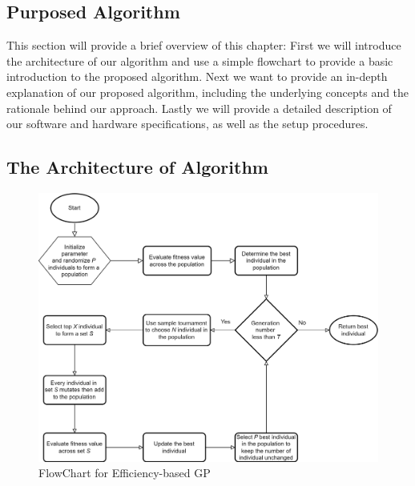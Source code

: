 \begin{ZhChapter}

    \chapter{Purposed Algorithm}
    This section will provide a brief overview of this chapter: First we will introduce the architecture of our algorithm and use a simple flowchart to provide a basic introduction to the proposed algorithm. Next we want to provide an in-depth explanation of our proposed algorithm, including the underlying concepts and the rationale behind our approach. Lastly we will provide a detailed description of our software and hardware specifications, as well as the setup procedures.
    \section{The Architecture of Algorithm} %
    \begin{figure}[htbp]
        \centering
        \includegraphics[width = 1\textwidth]{image/FlowChart.png}
        \caption{FlowChart for Efficiency-based GP}
        \label{fig: image}
    \end{figure}



\end{ZhChapter}
